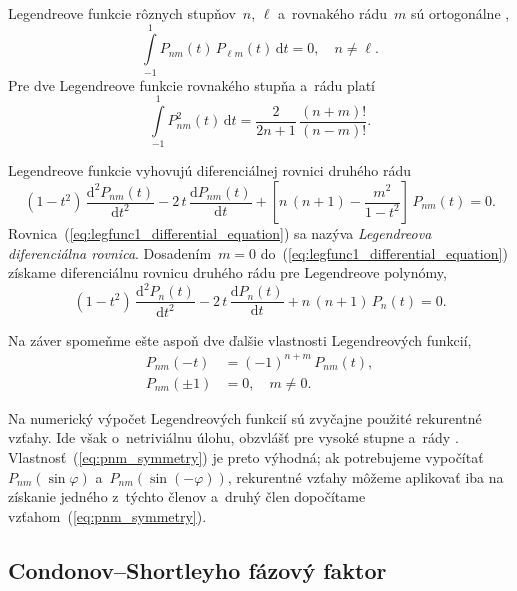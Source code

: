 \documentclass[a4paper, 12pt]{book}
\newcommand{\diff}{\mathrm d}
\begin{document}
Legendreove funkcie rôznych stupňov~$n$, $\ell$ a~rovnakého rádu~$m$ sú
ortogonálne \parencite{Freeden2009},
%
\begin{equation}
\label{eq:pnm_orthogonality}
\int\limits_{-1}^{1} P_{nm}(t) \, P_{\ell m}(t) \, \diff t = 0{,} \quad n \neq 
\ell{.}
\end{equation}
%
Pre dve Legendreove funkcie rovnakého stupňa a~rádu platí
\begin{equation}
\label{eq:pnm_times_pnm}
\int\limits_{-1}^{1} P^2_{nm}(t) \, \diff t = \frac{2}{2n + 1} \, \frac{(n 
+ m)!}{(n - m)!}{.}
\end{equation}

Legendreove funkcie vyhovujú diferenciálnej rovnici druhého rádu 
\parencite{SansoGeoidDetermination}
%
\begin{equation}
\label{eq:legfunc1_differential_equation}
(1 - t^2) \, \frac{\diff^2 P_{nm}(t)}{\diff t^2} - 2 \, t \, \frac{\diff 
P_{nm}(t)}{\diff t} + \left[ n \, (n + 1) - \frac{m^2}{1 - t^2} \right] \, 
P_{nm}(t) = 0{.}
\end{equation}
%
Rovnica~(\ref{eq:legfunc1_differential_equation}) sa nazýva \emph{Legendreova 
diferenciálna rovnica}.  Dosadením~$m = 0$ 
do~(\ref{eq:legfunc1_differential_equation}) získame diferenciálnu rovnicu 
druhého rádu pre Legendreove polynómy,
%
\begin{equation}
\label{eq:legpol_differential_equation}
(1 - t^2) \, \frac{\diff^2 P_n(t)}{\diff t^2} - 2 \, t \, \frac{\diff 
P_n(t)}{\diff t} + n \, (n + 1) \, P_n(t) = 0{.}
\end{equation}

Na záver spomeňme ešte aspoň dve ďalšie vlastnosti Legendreových funkcií,
%
\begin{align}
\label{eq:pnm_symmetry}
P_{nm}(-t) &= (-1)^{n + m} \, P_{nm}(t){,}\\
%
P_{nm}(\pm1) &= 0{,} \quad m \neq 0{.}
\end{align}

Na numerický výpočet Legendreových funkcií sú zvyčajne použité rekurentné 
vzťahy.  Ide však o~netriviálnu úlohu, obzvlášť pre vysoké stupne a~rády 
\parencite{Holmes2002a,Fukushima2012a,Ishioka2018}.  
Vlastnosť~(\ref{eq:pnm_symmetry}) je preto výhodná; ak potrebujeme vypočítať 
$P_{nm}(\sin\varphi)$ a~$P_{nm}(\sin(-\varphi))$, rekurentné vzťahy môžeme 
aplikovať iba na získanie jedného z~týchto členov a~druhý člen dopočítame 
vzťahom~(\ref{eq:pnm_symmetry}).

\subsection{Condonov--Shortleyho fázový faktor}
\label{sec:legendre_functions_cs_factor}
\end{document}
